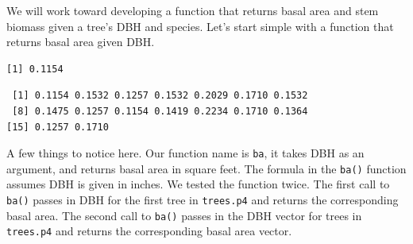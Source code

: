 \documentclass[]{krantz}
\makeatletter
\newenvironment{Shaded}{\begin{snugshade}}{\end{snugshade}}
\newcommand{\KeywordTok}[1]{\textcolor[rgb]{0.27,0.27,0.27}{\textbf{#1}}}
\newcommand{\DecValTok}[1]{\textcolor[rgb]{0.06,0.06,0.06}{#1}}
\newcommand{\FloatTok}[1]{\textcolor[rgb]{0.06,0.06,0.06}{#1}}
\newcommand{\StringTok}[1]{\textcolor[rgb]{0.5,0.5,0.5}{#1}}
\newcommand{\ControlFlowTok}[1]{\textcolor[rgb]{0.27,0.27,0.27}{\textbf{#1}}}
\newcommand{\OperatorTok}[1]{\textcolor[rgb]{0.43,0.43,0.43}{\textbf{#1}}}
\newcommand{\ErrorTok}[1]{\textcolor[rgb]{0.14,0.14,0.14}{\textbf{#1}}}
\newcommand{\NormalTok}[1]{#1}
\newenvironment{kframe}{%
\medskip{}
\setlength{\fboxsep}{.8em}
 \def\at@end@of@kframe{}%
 \ifinner\ifhmode%
  \def\at@end@of@kframe{\end{minipage}}%
  \begin{minipage}{\columnwidth}%
 \fi\fi%
 \def\FrameCommand##1{\hskip\@totalleftmargin \hskip-\fboxsep
 \colorbox{shadecolor}{##1}\hskip-\fboxsep
     \hskip-\linewidth \hskip-\@totalleftmargin \hskip\columnwidth}%
 \MakeFramed {\advance\hsize-\width
   \@totalleftmargin\z@ \linewidth\hsize
   \@setminipage}}%
 {\par\unskip\endMakeFramed%
 \at@end@of@kframe}
\renewenvironment{Shaded}{\begin{kframe}}{\end{kframe}}
\theoremstyle{definition}
\theoremstyle{definition}
\theoremstyle{definition}
\theoremstyle{remark}
\makeatother
\begin{document}
We will work toward developing a function that returns basal area and
stem biomass given a tree's DBH and species. Let's start simple with a
function that returns basal area given DBH.

\begin{Shaded}
\end{Shaded}

\begin{verbatim}
[1] 0.1154
\end{verbatim}

\begin{Shaded}
\end{Shaded}

\begin{verbatim}
 [1] 0.1154 0.1532 0.1257 0.1532 0.2029 0.1710 0.1532
 [8] 0.1475 0.1257 0.1154 0.1419 0.2234 0.1710 0.1364
[15] 0.1257 0.1710
\end{verbatim}

A few things to notice here. Our function name is \texttt{ba}, it takes
DBH as an argument, and returns basal area in square feet. The formula
in the \texttt{ba()} function assumes DBH is given in inches. We tested
the function twice. The first call to \texttt{ba()} passes in DBH for
the first tree in \texttt{trees.p4} and returns the corresponding basal
area. The second call to \texttt{ba()} passes in the DBH vector for
trees in \texttt{trees.p4} and returns the corresponding basal area
vector.
\end{document}
